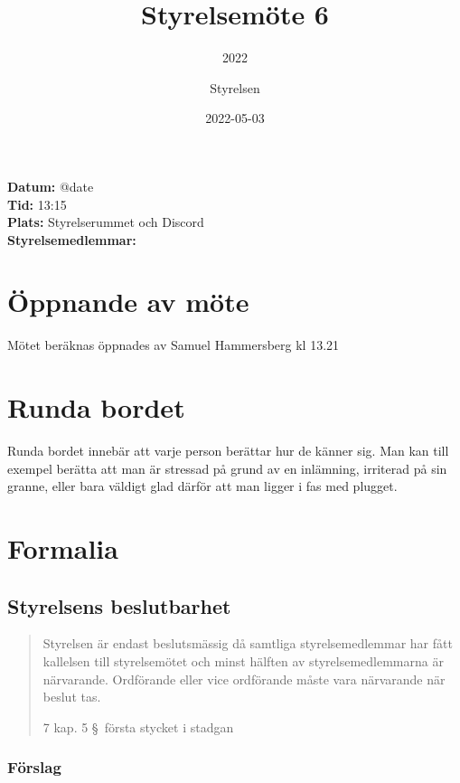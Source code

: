 \documentclass[protokoll]{dvd}
\begin{document}
\title{Styrelsemöte 6}
\subtitle{2022}
\author{Styrelsen}
\date{2022-05-03}

\textbf{Datum:} \csname @date\endcsname\\
\textbf{Tid:} 13:15\\
\textbf{Plats:} Styrelserummet och Discord\\
\textbf{Styrelsemedlemmar:}
\begin{närvarande_förtroendevalda}
\end{närvarande_förtroendevalda}


\section{Öppnande av möte}

Mötet beräknas öppnades av Samuel Hammersberg kl 13.21

\section{Runda bordet}

Runda bordet innebär att varje person berättar hur de känner sig.
Man kan till exempel berätta att man är stressad på grund av en inlämning, irriterad på sin granne, eller bara väldigt glad därför att man ligger i fas med plugget.

\section{Formalia}

\subsection{Styrelsens beslutbarhet}

\blockquote[7 kap. 5 \S~första stycket i stadgan][]{%
    Styrelsen är endast beslutsmässig då samtliga styrelsemedlemmar har fått kallelsen till styrelsemötet och minst hälften av styrelsemedlemmarna är närvarande.
    Ordförande eller vice ordförande måste vara närvarande när beslut tas.
}

\subsubsection*{Förslag}
\end{document}

